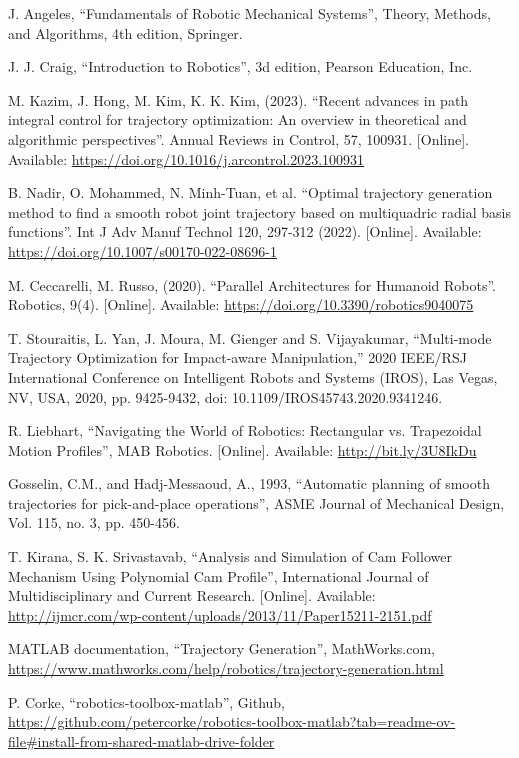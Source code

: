 \documentclass[conference]{IEEEtran}
\begin{document}
\begin{thebibliography}{00}
     J. Angeles, ``Fundamentals of Robotic Mechanical Systems'', Theory, Methods, and Algorithms, 4th edition, Springer.

     J. J. Craig, ``Introduction to Robotics'', 3d edition, Pearson Education, Inc.

     M. Kazim, J. Hong, M. Kim, K. K. Kim, (2023). ``Recent advances in path integral control for trajectory optimization: An overview in theoretical and algorithmic perspectives''. Annual Reviews in Control, 57, 100931. [Online]. Available: \url{https://doi.org/10.1016/j.arcontrol.2023.100931}

     B. Nadir, O. Mohammed, N. Minh-Tuan, et al. ``Optimal trajectory generation method to find a smooth robot joint trajectory based on multiquadric radial basis functions''. Int J Adv Manuf Technol 120, 297-312 (2022). [Online]. Available: \url{https://doi.org/10.1007/s00170-022-08696-1}

     M. Ceccarelli, M. Russo, (2020). ``Parallel Architectures for Humanoid Robots''. Robotics, 9(4). [Online]. Available: \url{https://doi.org/10.3390/robotics9040075}

     T. Stouraitis, L. Yan, J. Moura, M. Gienger and S. Vijayakumar, ``Multi-mode Trajectory Optimization for Impact-aware Manipulation,'' 2020 IEEE/RSJ International Conference on Intelligent Robots and Systems (IROS), Las Vegas, NV, USA, 2020, pp. 9425-9432, doi: 10.1109/IROS45743.2020.9341246.

     R. Liebhart, ``Navigating the World of Robotics: Rectangular vs. Trapezoidal Motion Profiles'', MAB Robotics. [Online]. Available: \url{http://bit.ly/3U8IkDu}

     Gosselin, C.M., and Hadj-Messaoud, A., 1993, “Automatic planning of smooth trajectories for
    pick-and-place operations”, ASME Journal of Mechanical Design, Vol. 115, no. 3, pp. 450-456.

     T. Kirana, S. K. Srivastavab, ``Analysis and Simulation of Cam Follower Mechanism Using Polynomial Cam Profile'', International Journal of Multidisciplinary and Current Research. [Online]. Available: \url{http://ijmcr.com/wp-content/uploads/2013/11/Paper15211-2151.pdf}

     MATLAB documentation, ``Trajectory Generation'', MathWorks.com, \url{https://www.mathworks.com/help/robotics/trajectory-generation.html}

     P. Corke, ``robotics-toolbox-matlab'', Github, \url{https://github.com/petercorke/robotics-toolbox-matlab?tab=readme-ov-file#install-from-shared-matlab-drive-folder}
\end{thebibliography}
\end{document}
